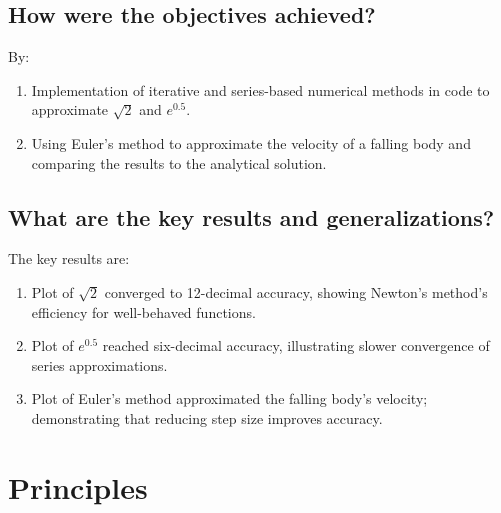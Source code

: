	
\subsection{How were the objectives achieved?}
By:
\begin{enumerate}
\item Implementation of iterative and series-based numerical methods in code to approximate $\sqrt{2}$ and $e^{0.5}$.
\item Using Euler’s method to approximate the velocity of a falling body and comparing the results to the analytical solution.
\end{enumerate}
	
\subsection{What are the key results and generalizations?}
The key results are:
\begin{enumerate}
\item Plot of $\sqrt{2}$ converged to 12-decimal accuracy, showing Newton’s method’s efficiency for well-behaved functions.
\item Plot of $e^{0.5}$ reached six-decimal accuracy, illustrating slower convergence of series approximations.
\item Plot of Euler’s method approximated the falling body’s velocity; demonstrating that reducing step size improves accuracy.
\end{enumerate}

 








\section{Principles}
\label{sec:concps}

